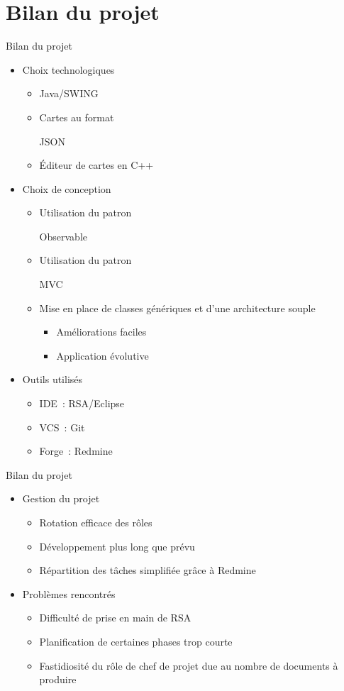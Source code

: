 \section{Bilan du projet}
\begin{frame}{Bilan du projet}
\begin{itemize}
	\item Choix technologiques
	\begin{itemize}
		\item Java/SWING
		\item Cartes au format \begin{em}JSON\end{em}
		\item Éditeur de cartes en C++
	\end{itemize}
	\item Choix de conception
	\begin{itemize}
		\item Utilisation du patron \begin{em}Observable\end{em}
		\item Utilisation du patron \begin{em}MVC\end{em}
		\item Mise en place de classes génériques et d'une architecture souple
		\begin{itemize}
			\item Améliorations faciles
			\item Application évolutive
		\end{itemize}
	\end{itemize}
	\item Outils utilisés
	\begin{itemize}
		\item IDE~: RSA/Eclipse
		\item VCS~: Git
		\item Forge~: Redmine
	\end{itemize}
\end{itemize}
\end{frame}
\begin{frame}{Bilan du projet}
\begin{itemize}
	\item Gestion du projet
	\begin{itemize}
		\item Rotation efficace des rôles
		\item Développement plus long que prévu
		\item Répartition des tâches simplifiée grâce à Redmine
	\end{itemize}
	\item Problèmes rencontrés
	\begin{itemize}
		\item Difficulté de prise en main de RSA
		\item Planification de certaines phases trop courte
		\item Fastidiosité du rôle de chef de projet due au nombre de documents à produire
	\end{itemize}
\end{itemize}
\end{frame}
